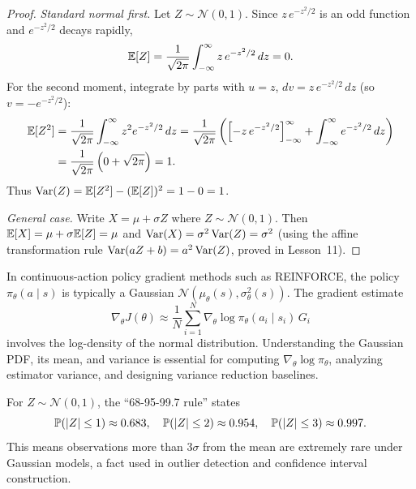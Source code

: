 \documentclass[11pt,a4paper]{article}
\begin{document}
\begin{proof}
\emph{Standard normal first.} Let $Z \sim \mathcal{N}(0,1)$. Since
$z \, e^{-z^2/2}$ is an odd function and $e^{-z^2/2}$ decays rapidly,
\[
    \mathbb{E}[Z] = \frac{1}{\sqrt{2\pi}} \int_{-\infty}^{\infty}
    z \, e^{-z^2/2} \, dz = 0.
\]
For the second moment, integrate by parts with $u = z$,
$dv = z \, e^{-z^2/2}\,dz$ (so $v = -e^{-z^2/2}$):
\begin{align*}
    \mathbb{E}[Z^2] &= \frac{1}{\sqrt{2\pi}} \int_{-\infty}^{\infty}
    z^2 e^{-z^2/2} \, dz
    = \frac{1}{\sqrt{2\pi}}
    \left(\left[-z \, e^{-z^2/2}\right]_{-\infty}^{\infty}
    + \int_{-\infty}^{\infty} e^{-z^2/2} \, dz\right) \\
    &= \frac{1}{\sqrt{2\pi}} \left(0 + \sqrt{2\pi}\right) = 1.
\end{align*}
Thus $\operatorname{Var}(Z) = \mathbb{E}[Z^2] - (\mathbb{E}[Z])^2 = 1 - 0 = 1$.

\emph{General case.} Write $X = \mu + \sigma Z$ where
$Z \sim \mathcal{N}(0,1)$. Then
$\mathbb{E}[X] = \mu + \sigma \mathbb{E}[Z] = \mu$ and
$\operatorname{Var}(X) = \sigma^2 \operatorname{Var}(Z) = \sigma^2$ (using the affine
transformation rule $\operatorname{Var}(aZ + b) = a^2 \operatorname{Var}(Z)$, proved in Lesson~11).
\end{proof}

\begin{rlconnection}[title={Gaussian Noise in Policy Gradient Methods}]
In continuous-action policy gradient methods such as REINFORCE, the
policy $\pi_\theta(a \mid s)$ is typically a Gaussian
$\mathcal{N}(\mu_\theta(s), \sigma_\theta^2(s))$. The gradient estimate
\[
    \nabla_\theta J(\theta)
    \approx \frac{1}{N} \sum_{i=1}^N
    \nabla_\theta \log \pi_\theta(a_i \mid s_i) \, G_i
\]
involves the log-density of the normal distribution. Understanding the
Gaussian PDF, its mean, and variance is essential for computing
$\nabla_\theta \log \pi_\theta$, analyzing estimator variance, and
designing variance reduction baselines.
\end{rlconnection}

\begin{example}
\label{ex:normal_tails}
For $Z \sim \mathcal{N}(0,1)$, the ``68-95-99.7 rule'' states
\[
    \mathbb{P}(|Z| \leq 1) \approx 0.683, \quad
    \mathbb{P}(|Z| \leq 2) \approx 0.954, \quad
    \mathbb{P}(|Z| \leq 3) \approx 0.997.
\]
This means observations more than $3\sigma$ from the mean are extremely
rare under Gaussian models, a fact used in outlier detection and
confidence interval construction.
\end{example}
\end{document}
